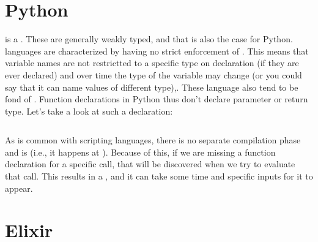 \section{Python}

 is a . These are generally weakly typed, and that is also the case for Python.  languages are characterized by having no strict enforcement of . This means that variable names are not restrictted to a specific type on declaration (if they are ever declared) and over time the type of the variable may change (or you could say that it can name values of different type),. These language also tend to be fond of . Function declarations in Python thus don't declare parameter or return type. Let's take a look at such a declaration:

\inputminted[firstline=3]{python}{../src/python/functions/add/add.py}

As is common with scripting languages, there is no separate compilation phase and  is  (i.e., it happens at ). Because of this, if we are missing a function declaration for a specific call, that will be discovered when we try to evaluate that call. This results in a , and it can take some time and specific inputs for it to appear.

\section{Elixir}

